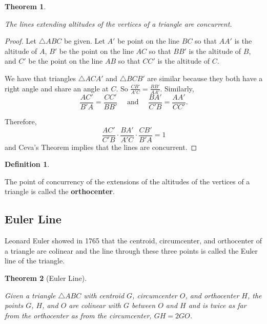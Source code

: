 \documentclass[
]{book}
\newtheorem{theorem}{Theorem}[chapter]
\theoremstyle{definition}
\newtheorem{definition}{Definition}[chapter]
\theoremstyle{definition}
\theoremstyle{definition}
\theoremstyle{definition}
\theoremstyle{remark}
\begin{document}
\begin{theorem}
\protect\hypertarget{thm:unlabeled-div-195}{}\label{thm:unlabeled-div-195}

The lines extending altitudes of the vertices of a triangle are concurrent.

\end{theorem}

\begin{proof}

Let \(\triangle ABC\) be given. Let \(A'\) be point on the line \(BC\) so that \(AA'\) is the altitude of \(A\), \(B'\) be the point on the line \(AC\) so that \(BB'\) is the altitude of \(B\), and \(C'\) be the point on the line \(AB\) so that \(CC'\) is the altitude of \(C\).

We have that triangles \(\triangle ACA'\) and \(\triangle BCB'\) are similar because they both have a right angle and share an angle at \(C\). So \(\frac{CB'}{A'C}=\frac{BB'}{AA'}\). Similarly, \[\frac{AC'}{B'A} = \frac{CC'}{BB'} \quad \mbox{ and } \quad \frac{BA'}{C'B}=\frac{AA'}{CC'}.\]

Therefore, \[\frac{AC'}{C'B} \cdot \frac{BA'}{A'C} \cdot \frac{CB'}{B'A} = 1\] and Ceva's Theorem implies that the lines are concurrent.

\end{proof}

\begin{definition}
\protect\hypertarget{def:unlabeled-div-197}{}\label{def:unlabeled-div-197}

The point of concurrency of the extensions of the altitudes of the vertices of a triangle is called the \textbf{orthocenter}.

\end{definition}

\hypertarget{euler-line}{%
\subsection{Euler Line}\label{euler-line}}

Leonard Euler showed in 1765 that the centroid, circumcenter, and orthocenter of a triangle are colinear and the line through these three points is called the Euler line of the triangle.

\begin{theorem}[Euler Line]
\protect\hypertarget{thm:unlabeled-div-198}{}\label{thm:unlabeled-div-198}

Given a triangle \(\triangle ABC\) with centroid \(G\), circumcenter \(O\), and orthocenter \(H\), the points \(G\), \(H\), and \(O\) are colinear with \(G\) between \(O\) and \(H\) and is twice as far from the orthocenter as from the circumcenter, \(GH=2GO\).

\end{theorem}
\end{document}
